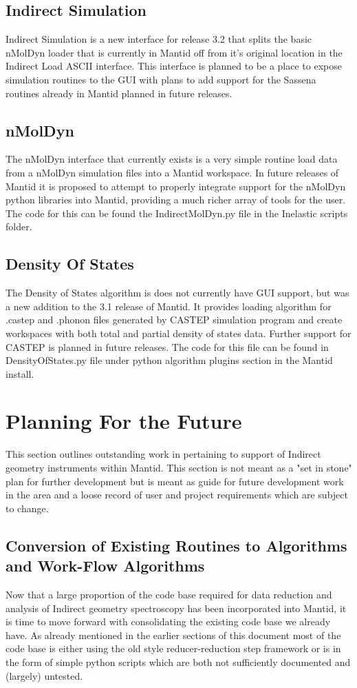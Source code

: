 \documentclass[paper=a4, fontsize=11pt]{scrartcl}	%
\numberwithin{equation}{section}															%
\numberwithin{figure}{section}																%
\numberwithin{table}{section}																%
\begin{document}
\subsection{Indirect Simulation}
Indirect Simulation is a new interface for release 3.2 that splits the basic nMolDyn loader that is currently in Mantid off from it's original location in the Indirect Load ASCII interface. This interface is planned to be a place to expose simulation routines to the GUI with plans to add support for the Sassena routines already in Mantid planned in future releases.

\subsection{nMolDyn}
The nMolDyn interface that currently exists is a very simple routine load data from a nMolDyn simulation files into a Mantid workspace. In future releases of Mantid it is proposed to attempt to properly integrate support for the nMolDyn python libraries into Mantid, providing a much richer array of tools for the user. The code for this can be found the IndirectMolDyn.py file in the Inelastic scripts folder.

\subsection{Density Of States}
The Density of States algorithm is does not currently have GUI support, but was a new addition to the 3.1 release of Mantid. It provides loading algorithm for .castep and .phonon files generated by CASTEP simulation program and create workspaces with both total and partial density of states data. Further support for CASTEP is planned in future releases. The code for this file can be found in DensityOfStates.py file under python algorithm plugins section in the Mantid install.

\section{Planning For the Future}
This section outlines outstanding work in pertaining to support of Indirect geometry instruments within Mantid. This section is not meant as a "set in stone" plan for further development but is meant as guide for future development work in the area and a loose record of user and project requirements which are subject to change.

\subsection{Conversion of Existing Routines to Algorithms and Work-Flow Algorithms}
Now that a large proportion of the code base required for data reduction and analysis of Indirect geometry spectroscopy has been incorporated into Mantid, it is time to move forward with consolidating the existing code base we already have. As already mentioned in the earlier sections of this document most of the code base is either using the old style reducer-reduction step framework or is in the form of simple python scripts which are both not sufficiently documented and (largely) untested.
\end{document}
